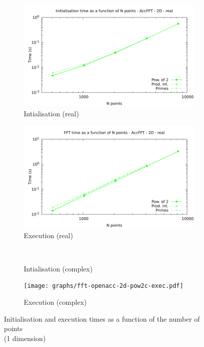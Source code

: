 \documentclass[12pt, a4paper]{article}
\begin{document}
\begin{figure}[H]
\captionsetup{width=0.8\linewidth}
\centering
\begin{subfigure}{.5\textwidth}
\centering
\includegraphics[width=.9\linewidth]{graphs/fft-openacc-2d-pow2-r-init.pdf}
\caption{Intialisation (real)}
\label{FFTACC1DRI}
\end{subfigure}%
\begin{subfigure}{.5\textwidth}
\centering
\includegraphics[width=.9\linewidth]{graphs/fft-openacc-2d-pow2-r-exec.pdf}
\caption{Execution (real)}
\label{FFTACC1DRE}
\end{subfigure}\\
\begin{subfigure}{.5\textwidth}
\centering
\caption{Intialisation (complex)}
\label{FFTACC1DCI}
\end{subfigure}%
\begin{subfigure}{.5\textwidth}
\centering
\texttt{[image: graphs/fft-openacc-2d-pow2c-exec.pdf]}
\caption{Execution (complex)}
\label{FFTACC1DCE}
\end{subfigure}
\caption{Initialisation and execution times as a function of the number of points\\(1 dimension)}
\label{FFTCL1D}
\end{figure}
\end{document}
